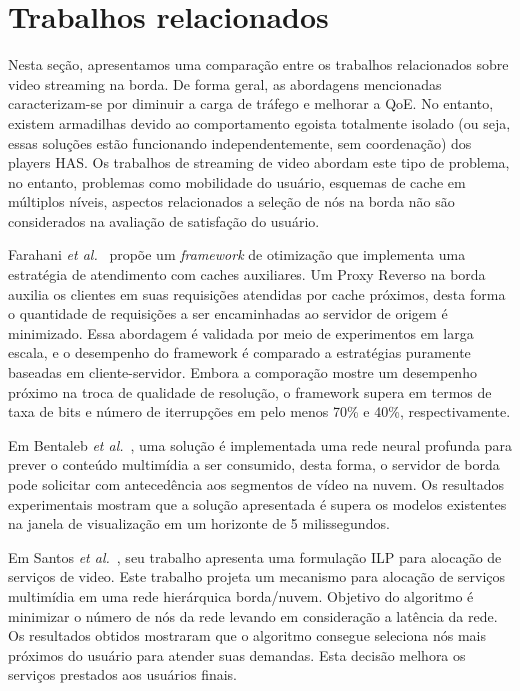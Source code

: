 \section{Trabalhos relacionados}

Nesta seção, apresentamos uma comparação entre os trabalhos relacionados sobre video streaming na borda.
De forma geral, as abordagens mencionadas caracterizam-se por diminuir a carga de tráfego e melhorar a QoE.
No entanto, existem armadilhas devido ao comportamento egoista totalmente isolado (ou seja, essas soluções estão funcionando independentemente, sem coordenação) dos players HAS. Os trabalhos de streaming de video abordam este tipo de problema, no entanto, problemas como mobilidade do usuário, esquemas de cache em múltiplos níveis, aspectos relacionados a seleção de nós na borda não são considerados na avaliação de satisfação do usuário.

Farahani \textit{et al.}~\cite{Farahani} propõe um \textit{framework} de otimização que implementa uma estratégia de atendimento com caches auxiliares. Um Proxy Reverso na borda auxilia os clientes em suas requisições atendidas por cache próximos, desta forma o quantidade de requisições a ser encaminhadas ao servidor de origem é minimizado.
Essa abordagem é validada por meio de experimentos em larga escala, e o desempenho do framework é comparado a estratégias puramente baseadas em cliente-servidor. Embora a comporação mostre um desempenho próximo na troca de qualidade de resolução, o framework supera em termos de taxa de bits e número de iterrupções em pelo menos 70\% e 40\%, respectivamente.

Em Bentaleb \textit{et al.}~\cite{Khan}, uma solução é implementada uma rede neural profunda para prever o conteúdo multimídia a ser consumido, desta forma, o servidor de borda pode solicitar com antecedência aos segmentos de vídeo na nuvem.
Os resultados experimentais mostram que a solução apresentada é supera os modelos existentes na janela de visualização em um horizonte de 5 milissegundos.

Em Santos \textit{et al.}~\cite{Santos}, seu trabalho apresenta uma formulação ILP para alocação de serviços de video. Este trabalho projeta um mecanismo para alocação de serviços multimídia em uma rede hierárquica borda/nuvem. Objetivo do algoritmo é minimizar o número de nós da rede levando em consideração a latência da rede. 
Os resultados obtidos mostraram que o algoritmo consegue seleciona nós mais próximos do usuário para atender suas demandas. Esta decisão melhora os serviços prestados aos usuários finais.

